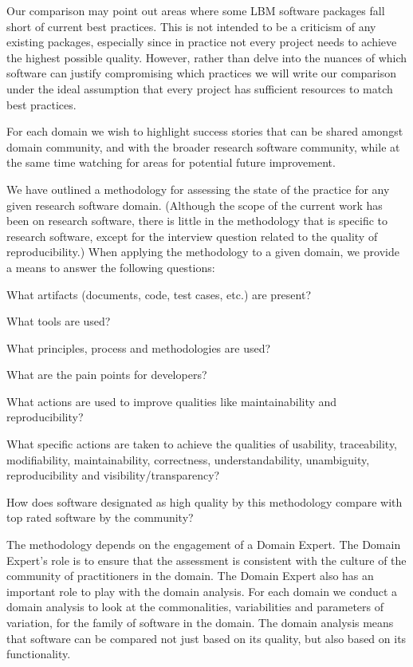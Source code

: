 \documentclass[runningheads]{llncs}
\begin{document}
Our comparison may point out areas where some LBM software
packages fall short of current best practices. This is not intended to be a
criticism of any existing packages, especially since in practice not every
project needs to achieve the highest possible quality.  However, rather than
delve into the nuances of which software can justify compromising which
practices we will write our comparison under the ideal assumption that every
project has sufficient resources to match best practices.

For each domain we wish to highlight success stories that can be shared amongst
domain community, and with the broader research software community, while at the
same time watching for areas for potential future improvement.

We have outlined a methodology for assessing the state of the practice for any
given research software domain.  (Although the scope of the current work has been
on research software, there is little in the methodology that is specific to
research software, except for the interview question related to the quality of
reproducibility.)  When applying the methodology to a given domain, we provide a
means to answer the following questions:
\begin{inparaenum}[i)]
\item What artifacts (documents, code, test cases, etc.) are present?
\item What tools are used?
\item What principles, process and methodologies are used?
\item What are the pain points for developers?
\item What actions are used to improve qualities like maintainability and
reproducibility?
\item What specific actions are taken to achieve the qualities of usability,
traceability, modifiability, maintainability, correctness, understandability,
unambiguity, reproducibility and visibility/transparency?
\item How does software designated as high quality by this methodology compare
  with top rated software by the community?
\end{inparaenum} 

The methodology depends on the engagement of a Domain Expert.  The Domain
Expert's role is to ensure that the assessment is consistent with the culture of
the community of practitioners in the domain.  The Domain Expert also has an
important role to play with the domain analysis.  For each domain we 
conduct a domain analysis to look at the commonalities, variabilities and
parameters of variation, for the family of software in the domain.  The domain
analysis means that software can be compared not just based on its quality, but
also based on its functionality.
\end{document}

